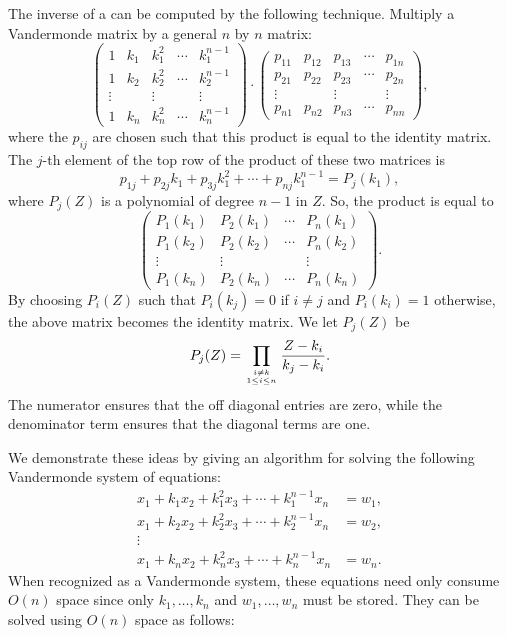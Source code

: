 The inverse of a  can be computed by the
following technique.  Multiply a Vandermonde matrix by a general $n$
by $n$ matrix:
\begin{equation}\label{Vander:InvProd:Eq}
\begin{pmatrix}
1&k_1&k_1^2&\cdots&k_1^{n-1}\\
1&k_2&k_2^2&\cdots&k_2^{n-1}\\
\vdots& & \vdots& & \vdots\\
1&k_n&k_n^2&\cdots&k_n^{n-1}
\end{pmatrix} \cdot
\begin{pmatrix}
p_{11}&p_{12}&p_{13}&\cdots&p_{1n}\\
p_{21}&p_{22}&p_{23}&\cdots&p_{2n}\\
\vdots& & \vdots& &\vdots\\
p_{n1}&p_{n2}&p_{n3}&\cdots&p_{nn}
\end{pmatrix},
\end{equation}
where the $p_{ij}$ are chosen such that this product is equal to the
identity matrix.
The $j$-th element of the top row of the product of these two matrices is
\[
p_{1j} + p_{2j} k_1 + p_{3j} k_1^2 + \cdots + p_{nj} k_1^{n-1} = P_j(k_1),
\]
where $P_j(Z)$ is a polynomial of degree $n-1$ in $Z$.
So, the product  is equal to 
\[
\begin{pmatrix}P_1(k_1)& P_2(k_1) & \cdots & P_n(k_1)\\
P_1(k_2)& P_2(k_2) & \cdots & P_n(k_2)\\
\vdots & \vdots & & \vdots\\
P_1(k_n)& P_2(k_n) & \cdots & P_n(k_n)\end{pmatrix}.
\]
By choosing $P_i(Z)$ such that $P_i(k_j) = 0$ if $i\not= j$ and
$P_i(k_i) =1$ otherwise, the above matrix becomes the identity matrix.
We let $P_j(Z)$ be
\begin{equation} \label{Vander:Pj:Eq}
P_j(Z) = \prod_{\genfrac{}{}{0pt}{2}{i \not= k}{1 \le i \le n}}
  {Z - k_i \over k_j - k_i}.
\end{equation}
The numerator ensures that the off diagonal entries are zero, while
the denominator term ensures that the diagonal terms are one.

\medskip
We demonstrate these ideas by giving an algorithm for solving the following
Vandermonde system of equations: 
\begin{equation}\label{VandermondeSys:Eq}
\begin{aligned}
x_1 + k_1 x_2 + k_1^2 x_3 + \cdots + k_1^{n-1} x_n & = w_1,\\
x_1 + k_2 x_2 + k_2^2 x_3 + \cdots + k_2^{n-1} x_n & = w_2,\\
\vdots\\
x_1 + k_n x_2 + k_n^2 x_3 + \cdots + k_n^{n-1} x_n & = w_n.
\end{aligned}
\end{equation}
When recognized as a Vandermonde system, these equations need only
consume $O(n)$ space since only $k_1, \ldots, k_n$ and $w_1, \ldots,
w_n$ must be stored.  They can be solved using $O(n)$ space as
follows:

